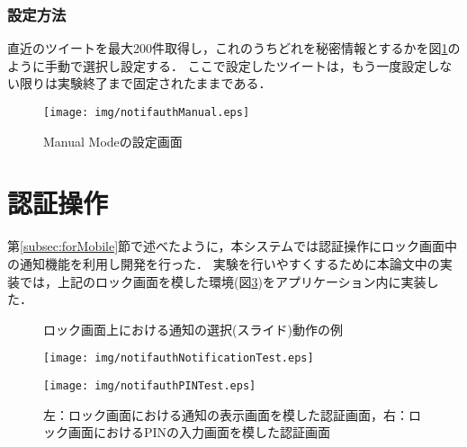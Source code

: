 \subsubsection{設定方法}
直近のツイートを最大200件取得し，これのうちどれを秘密情報とするかを図\ref{fig:notifauthManual}のように手動で選択し設定する．
ここで設定したツイートは，もう一度設定しない限りは実験終了まで固定されたままである．

\begin{figure}
  \begin{center}
    \texttt{[image: img/notifauthManual.eps]}
  \end{center}
  \caption{Manual Modeの設定画面}
  \label{fig:notifauthManual}
\end{figure}

\section{認証操作}\label{sec:authentication}
第\ref{subsec:forMobile}節で述べたように，本システムでは認証操作にロック画面中の通知機能を利用し開発を行った．
実験を行いやすくするために本論文中の実装では，上記のロック画面を模した環境(図\ref{fig:notifauthTest})をアプリケーション内に実装した．

\begin{figure}[ht]
  \begin{center}
  \end{center}
  \caption{ロック画面上における通知の選択(スライド)動作の例}
  \label{fig:notificationSliding}
\end{figure}

\begin{figure}[ht]
  \begin{minipage}{0.5\hsize}
    \begin{center}
      \texttt{[image: img/notifauthNotificationTest.eps]}
    \end{center}
  \end{minipage}
  \begin{minipage}{0.5\hsize}
    \begin{center}
      \texttt{[image: img/notifauthPINTest.eps]}
    \end{center}
  \end{minipage}
  \caption{左：ロック画面における通知の表示画面を模した認証画面，右：ロック画面におけるPINの入力画面を模した認証画面}
  \label{fig:notifauthTest}
\end{figure}

